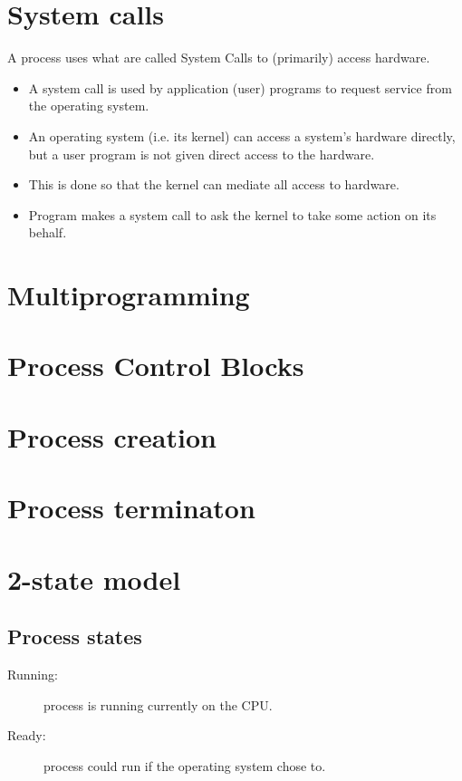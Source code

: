 \section{System calls}

A process uses what are called System Calls to (primarily) access hardware. 

\begin{itemize}
\item A system call is used by application (user) programs to request service from the operating system.
\item An operating system (i.e. its kernel) can access a system's hardware directly, but a user program is not given direct access to the hardware.
\item This is done so that the kernel can mediate all access to hardware.
\item Program makes a system call to ask the kernel to take some action on its behalf. 
\end{itemize}

\section{Multiprogramming}

\section{Process Control Blocks}

\section{Process creation}

\section{Process terminaton}

\section{2-state model}

\subsection{Process states}

\begin{description}
\item[Running:] process is running currently on the CPU.
\item[Ready:] process could run if the operating system chose to.
\end{description}


